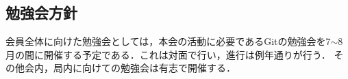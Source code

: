 \subsection*{勉強会方針}


会員全体に向けた勉強会としては，本会の活動に必要であるGitの勉強会を7$\sim$8月の間に開催する予定である．これは対面で行い，進行は例年通り\newGradeIfKouki{}\secondGrade{}が行う．
その他会内，局内に向けての勉強会は有志で開催する．
